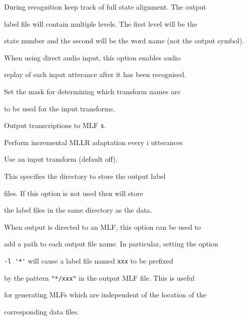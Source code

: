 \begin{optlist}
 During recognition keep track of full state alignment. The output


        label file will contain multiple levels. The first level will be the 


        state number and the second will be the word name (not the output symbol).





   When using direct audio input, this option enables audio


        replay of each input utterance after it has been recognised.





   Set the mask for determining which transform names are 


	to be used for the input transforms. 





   Output transcriptions to MLF \texttt{s}.





   Perform incremental MLLR adaptation every i utterances      





   Use an input transform (default off).





   This specifies the directory to store the  output label 


        files.  If this option is not used then  will store 


        the label files in the same directory as the data.


      When output is directed to an MLF, this option can be used to


      add a path to each output file name.  In particular, setting the option


      \verb+-l '*'+ will cause a label file named \texttt{xxx} to be prefixed


      by the pattern \verb+"*/xxx"+ in the output MLF file.  This is useful


      for generating MLFs which are independent of the location of the 


      corresponding data files.






\end{optlist}
